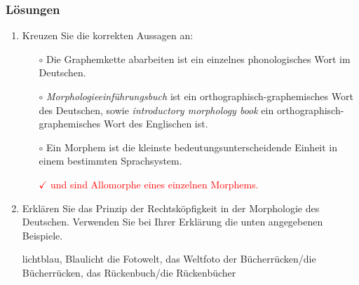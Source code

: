 

\begin{frame}
	\frametitle{Lösungen}

\begin{enumerate}
	\item Kreuzen Sie die korrekten Aussagen an: %
	
	\begin{itemize}
	\item[$\circ$] Die Graphemkette abarbeiten ist ein einzelnes phonologisches Wort im Deutschen.
	\item[$\circ$] \emph{Morphologieeinführungsbuch} ist ein orthographisch-graphemisches Wort des Deutschen, sowie \emph{introductory morphology book} ein orthographisch-graphemisches Wort des Englischen ist.
	\item[$\circ$] Ein Morphem ist die kleinste bedeutungsunterscheidende Einheit in einem bestimmten Sprachsystem.
	\item[\textcolor{red}{$\checkmark$}] \textcolor{red}{ und  sind Allomorphe eines einzelnen Morphems.}
\end{itemize}
	
	\item Erklären Sie das Prinzip der Rechtsköpfigkeit in der Morphologie des Deutschen. Verwenden Sie bei Ihrer Erklärung die unten angegebenen Beispiele.%
	
	\settowidth{}
		\eal
			\ex lichtblau, Blaulicht 
			\ex die Fotowelt, das Weltfoto 
			\ex der Bücherrücken/die Bücherrücken, das Rückenbuch/die Rückenbücher 
		\zl		
\end{enumerate}

\end{frame}



